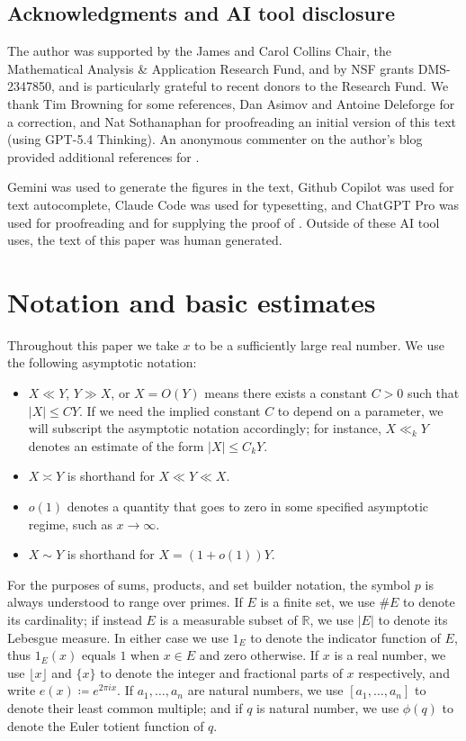 \documentclass[12pt]{amsart}
\newcommand{\R}{\mathbb{R}}
\begin{document}
\subsection{Acknowledgments and AI tool disclosure}

The author was supported by the James and Carol Collins Chair, the Mathematical Analysis \& Application Research Fund, and by NSF grants DMS-2347850, and is particularly grateful to recent donors to the Research Fund.  We thank Tim Browning for some references, Dan Asimov and Antoine Deleforge for a correction, and Nat Sothanaphan for proofreading an initial version of this text (using GPT-5.4 Thinking).  An anonymous commenter on the author's blog provided additional references for . 

Gemini was used to generate the figures in the text, Github Copilot was used for text autocomplete, Claude Code was used for typesetting, and ChatGPT Pro was used for proofreading and for supplying the proof of .  Outside of these AI tool uses, the text of this paper was human generated.

\section{Notation and basic estimates}\label{notation-sec}

Throughout this paper we take $x$ to be a sufficiently large real number.  We use the following asymptotic notation:
\begin{itemize}
\item[(i)] $X \ll Y$, $Y \gg X$, or $X = O(Y)$ means there exists a constant $C>0$ such that $|X| \leq CY$.  If we need the implied constant $C$ to depend on a parameter, we will subscript the asymptotic notation accordingly; for instance, $X \ll_k Y$ denotes an estimate of the form $|X| \leq C_k Y$.
\item[(ii)] $X \asymp Y$ is shorthand for $X \ll Y \ll X$.
\item[(iii)] $o(1)$ denotes a quantity that goes to zero in some specified asymptotic regime, such as $x \to \infty$.
\item[(iv)] $X \sim Y$ is shorthand for $X = (1+o(1))Y$.
\end{itemize}


For the purposes of sums, products, and set builder notation, the symbol $p$ is always understood to range over primes.
If $E$ is a finite set, we use $\# E$ to denote its cardinality; if instead $E$ is a measurable subset of $\R$, we use $|E|$ to denote its Lebesgue measure.  In either case we use $1_E$ to denote the indicator function of $E$, thus $1_E(x)$ equals $1$ when $x \in E$ and zero otherwise.  If $x$ is a real number, we use $\lfloor x \rfloor$ and $\{x\}$ to denote the integer and fractional parts of $x$ respectively, and write $e(x) \coloneqq e^{2\pi i x}$.  If $a_1,\dots,a_n$ are natural numbers, we use $[a_1,\dots,a_n]$ to denote their least common multiple; and if $q$ is natural number, we use $\phi(q)$ to denote the Euler totient function of $q$.
\end{document}
